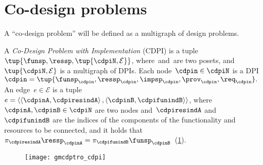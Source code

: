 

\section{Co-design problems}
\label{sec:Co-design-problems}

A ``co-design problem'' will be defined as a multigraph of design
problems.
\begin{definition}
  \label{def:cdpi}
  A \emph{Co-Design Problem with Implementation} (CDPI)
  is a tuple~$\tup{\funsp,\ressp,\tup{\cdpiN,\mathcal{E}}}$,
  where~\funsp and~\ressp are two posets, and~$\tup{ \cdpiN,\mathcal{E}} $
  is a multigraph of DPIs. Each node~$\cdpin\in\cdpiN$ is a
  DPI~$\cdpin=\tup{\funsp_{\cdpin},\ressp_{\cdpin},\impsp_{\cdpin},\prov_{\cdpin},\req_{\cdpin}}.$
  An edge~$e\in\mathcal{E}$ is a tuple $e=\left\langle \left\langle \cdpinA,\cdpiresindA\right\rangle ,\left\langle \cdpinB,\cdpifunindB\right\rangle \right\rangle $,
  where~$\cdpinA,\cdpinB\in\cdpiN$ are two nodes and~$\cdpiresindA$
  and~$\cdpifunindB$ are the indices of the components of the functionality
  and resources to be connected, and it holds that~$\pi_{\cdpiresindA}\ressp_{\cdpinA}=\pi_{\cdpifunindB}\funsp_{\cdpinB}$~(\cref{fig:mcdps}).

  \begin{figure}[h]
    \centering
    \texttt{[image: gmcdptro\_cdpi]}
    \caption{\label{fig:mcdps}}
  \end{figure}


\end{definition}

